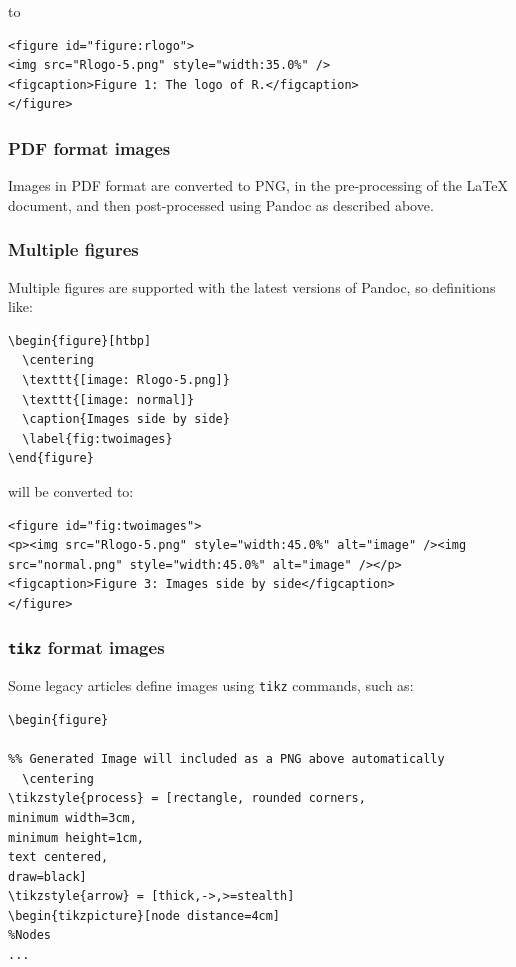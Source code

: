 to

\begin{verbatim}
<figure id="figure:rlogo">
<img src="Rlogo-5.png" style="width:35.0%" />
<figcaption>Figure 1: The logo of R.</figcaption>
</figure>
\end{verbatim}

\subsubsection{PDF format images}\label{pdf-format-images}

Images in PDF format are converted to PNG, in the pre-processing of the LaTeX document, and then post-processed using Pandoc as described above.

\subsubsection{Multiple figures}\label{multiple-figures}

Multiple figures are supported with the latest versions of Pandoc, so definitions like:

\begin{verbatim}
\begin{figure}[htbp]
  \centering
  \texttt{[image: Rlogo-5.png]}
  \texttt{[image: normal]}
  \caption{Images side by side}
  \label{fig:twoimages}
\end{figure}
\end{verbatim}

will be converted to:

\begin{verbatim}
<figure id="fig:twoimages">
<p><img src="Rlogo-5.png" style="width:45.0%" alt="image" /><img
src="normal.png" style="width:45.0%" alt="image" /></p>
<figcaption>Figure 3: Images side by side</figcaption>
</figure>
\end{verbatim}

\subsubsection{\texorpdfstring{\texttt{tikz} format images}{tikz format images}}\label{tikz-format-images}

Some legacy articles define images using \texttt{tikz} commands, such as:

\begin{verbatim}
\begin{figure}

%% Generated Image will included as a PNG above automatically
  \centering
\tikzstyle{process} = [rectangle, rounded corners,
minimum width=3cm, 
minimum height=1cm,
text centered, 
draw=black]
\tikzstyle{arrow} = [thick,->,>=stealth]
\begin{tikzpicture}[node distance=4cm]
%Nodes
...
\end{verbatim}

